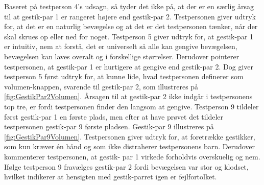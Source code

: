 Baseret på testperson 4’s udsagn, så tyder det ikke på, at der er en særlig årsag til at gestik-par 1 er rangeret højere end gestik-par 2. Testpersonen giver udtryk for, at det er en naturlig bevægelse og at det er det testpersonen tænker, når der skal skrues op eller ned for noget. Testperson 5 giver udtryk for, at gestik-par 1 er intuitiv, nem at forstå, det er universelt så alle kan gengive bevægelsen, bevægelsen kan laves overalt og i forskellige størrelser. Derudover pointerer testpersonen, at gestik-par 1 er hurtigere at gengive end gestik-par 2. Dog giver testperson 5 først udtryk for, at kunne lide, hvad testpersonen definerer som volumen-knappen, svarende til gestik-par 2, som illustreres på \autoref{fig:GestikPar2Volumen}. Årsagen til at gestik-par 2 ikke indgår i testpersonens top tre, er fordi testpersonen finder den langsom at gengive. Testperson 9 tildeler først gestik-par 1 en første plads, men efter at have prøvet det tildeler testpersonen gestik-par 9 første pladsen. Gestik-par 9 illustreres på \autoref{fig:GestikPar9Volumen}. Testpersonen giver udtryk for, at foretrække gestikker, som kun kræver én hånd og som ikke distraherer testpersonens barn. Derudover kommenterer testpersonen, at gestik- par 1 virkede forholdvis overskuelig og nem. Ifølge testperson 9 fravælges gestik-par 2 fordi bevægelsen var stor og klodset, hvilket indikerer at hensigten med gestik-parret igen er fejlfortolket.

